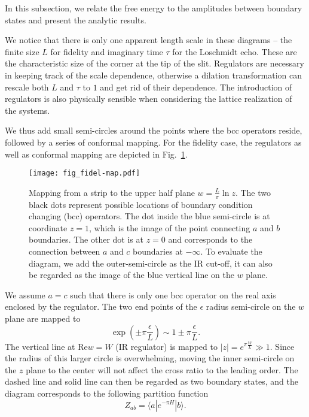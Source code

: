 
In this subsection, we relate the free energy to the amplitudes between boundary states and present the analytic results. 

We notice that there is only one apparent length scale in these diagrams -- the finite size $L$ for fidelity and imaginary time $\tau$ for the Loschmidt echo. These are the characteristic size of the corner at the tip of the slit. Regulators are necessary in keeping track of the scale dependence, otherwise a dilation transformation can rescale both $L$ and $\tau$ to $1$ and get rid of their dependence. The introduction of regulators is also physically sensible when considering the lattice realization of the systems. 

We thus add small semi-circles around the points where the bcc operators reside, followed by a series of conformal mapping. For the fidelity case, the regulators as well as conformal mapping are depicted in Fig.~\ref{fig:fidel-map}. 
\begin{figure}[h]
\centering
\texttt{[image: fig\_fidel-map.pdf]}
\caption{Mapping from a strip to the upper half plane $w = \frac{L}{\pi} \ln z $. The two black dots represent possible locations of boundary condition changing (bcc) operators. The dot inside the blue semi-circle is at coordinate $z = 1$, which is the image of the point connecting $a$ and $b$ boundaries. The other dot is at $z = 0$ and corresponds to the connection between $a$ and $c$ boundaries at $- \infty$. To evaluate the diagram, we add the outer-semi-circle as the IR cut-off, it can also be regarded as the image of the blue vertical line on the $w$ plane.}
\label{fig:fidel-map}
\end{figure}
We assume $a = c$ such that there is only one bcc operator on the real axis enclosed by the regulator. The two end points of the $\epsilon$ radius semi-circle on the $w$ plane are mapped to
\begin{equation}
\exp( \pm \pi \frac{\epsilon}{ L}  ) \sim 1 \pm \pi \frac{\epsilon}{L} .
\end{equation}
The vertical line at $\text{Re} w = W$ (IR regulator) is mapped to $|z| = e^{\pi \frac{W}{L} } \gg 1 $. Since the radius of this larger circle is overwhelming, moving the inner semi-circle on the $z$ plane to the center will not affect the cross ratio to the leading order. The dashed line and solid line can then be regarded as two boundary states, and the diagram corresponds to the following partition function 
\begin{equation}
  Z_{ab} = \langle a | e^{-\pi H } |b \rangle .
\end{equation}


